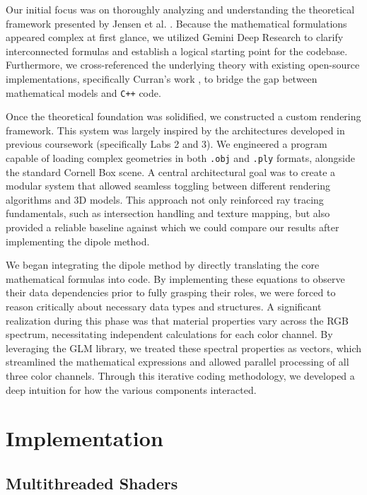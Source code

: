 \documentclass[sigconf,nonacm]{acmart}
\begin{document}
Our initial focus was on thoroughly analyzing and understanding the theoretical framework presented by Jensen et al. \cite{jensen2001practical}. Because the mathematical formulations appeared complex at first glance, we utilized Gemini Deep Research \cite{google2026gemini} to clarify interconnected formulas and establish a logical starting point for the codebase. Furthermore, we cross-referenced the underlying theory with existing open-source implementations, specifically Curran's work \cite{curranmax2013subsurface}, to bridge the gap between mathematical models and \texttt{C++} code.

Once the theoretical foundation was solidified, we constructed a custom rendering framework. This system was largely inspired by the architectures developed in previous coursework (specifically Labs 2 and 3). We engineered a program capable of loading complex geometries in both \texttt{.obj} and \texttt{.ply} formats, alongside the standard Cornell Box scene. A central architectural goal was to create a modular system that allowed seamless toggling between different rendering algorithms and 3D models. This approach not only reinforced ray tracing fundamentals, such as intersection handling and texture mapping, but also provided a reliable baseline against which we could compare our results after implementing the dipole method.

We began integrating the dipole method by directly translating the core mathematical formulas into code. By implementing these equations to observe their data dependencies prior to fully grasping their roles, we were forced to reason critically about necessary data types and structures. A significant realization during this phase was that material properties vary across the RGB spectrum, necessitating independent calculations for each color channel. By leveraging the GLM library, we treated these spectral properties as vectors, which streamlined the mathematical expressions and allowed parallel processing of all three color channels. Through this iterative coding methodology, we developed a deep intuition for how the various components interacted.

\section{Implementation}

\subsection{Multithreaded Shaders}
\end{document}
